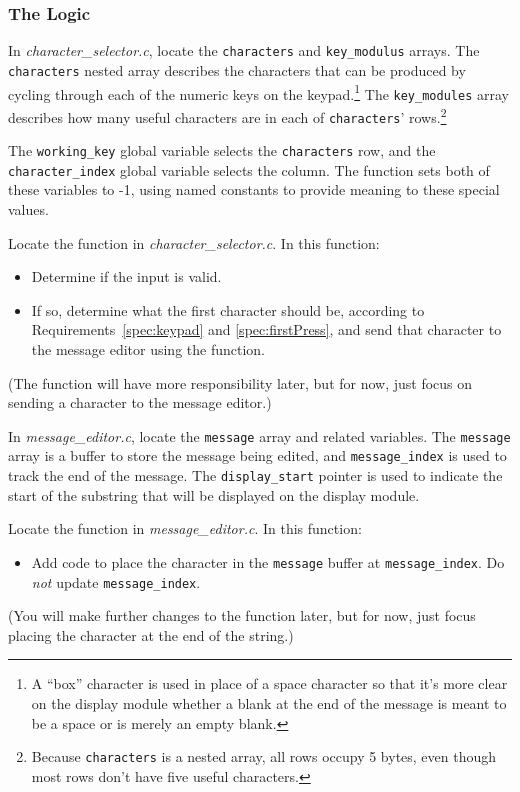 \subsubsection{The Logic} \label{subsubsec:logic}

In \textit{character\_selector.c}, locate the \lstinline{characters} and \lstinline{key_modulus} arrays.
The \lstinline{characters} nested array describes the characters that can be produced by cycling through each of the numeric keys on the keypad.\footnote{
    A ``box'' character is used in place of a space character so that it's more clear on the display module whether a blank at the end of the message is meant to be a space or is merely an empty blank.
}
The \lstinline{key_modules} array describes how many useful characters are in each of \lstinline{characters}' rows.\footnote{
    Because \lstinline{characters} is a nested array, all rows occupy 5 bytes, even though most rows don't have five useful characters.
}

The \lstinline{working_key} global variable selects the \lstinline{characters} row, and the \lstinline{character_index} global variable selects the column.
The  function sets both of these variables to -1, using named constants to provide meaning to these special values.

Locate the  function in \textit{character\_selector.c}.
In this function:
\begin{itemize}
    \item Determine if the input is valid.
    \item If so, determine what the first character should be, according to Requirements~\ref{spec:keypad} and \ref{spec:firstPress},
        and send that character to the message editor using the  function.
\end{itemize}
(The  function will have more responsibility later,
but for now, just focus on sending a character to the message editor.)

In \textit{message\_editor.c}, locate the \lstinline{message} array and related variables.
The \lstinline{message} array is a buffer to store the message being edited,
and \lstinline{message_index} is used to track the end of the message.
The \lstinline{display_start} pointer is used to indicate the start of the substring that will be displayed on the display module.

Locate the  function in \textit{message\_editor.c}.
In this function:
\begin{itemize}
    \item Add code to place the character in the \lstinline{message} buffer at \lstinline{message_index}.
        Do \textit{not} update \lstinline{message_index}.
\end{itemize}
(You will make further changes to the  function later,
but for now, just focus placing the character at the end of the string.)

